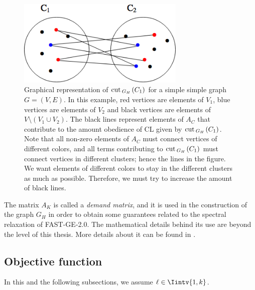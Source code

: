 \begin{figure}
\begin{center}
\includegraphics[width=8cm]{figures/gh.png}
\end{center}
   \caption[Graphical representation of $\cut_{G_H\,}(C_1)$ for a simple graph $G=(V,E)$]{Graphical representation of $\cut _{G_H\,}(C_1)$ for a simple simple graph $G = (V,E)$.  In this example, red vertices are elements of $V_1$, blue vertices are elements of $V_2$ and black vertices are elements of $V \setminus (V_1 \cup V_2)$. The black lines represent elements of $A_C$ that contribute to the amount obedience of CL given by $\cut _{G_H\,}(C_1)$. Note that all non-zero elements of $A_C$ must connect vertices of different colors, and all terms contributing to $\cut _{G_H\,}(C_1)$ must connect vertices in different clusters; hence the lines in the figure. We want elements of different colors to stay in the different clusters as much as possible. Therefore, we must try to increase the amount of black lines.}
\label{gh}
\end{figure}

The matrix $A_K$ is called a \textit{demand matrix}, and it is used in the construction of the graph $G_H$ in order to obtain some guarantees related to the spectral relaxation of FAST-GE-2.0. 
The mathematical details behind its use are beyond the level of this thesis.
More details about it can be found in \cite{fastge1}.


\subsection{Objective function}
In this and the following subsections, we assume $\ell \in \Iintv{1,k}$.

